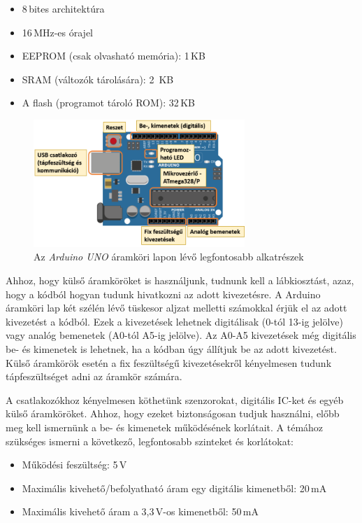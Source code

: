 \documentclass{thesis-ekf}
\theoremstyle{definition}
\begin{document}
\begin{itemize}
	\item 8\,bites architektúra
	\item 16\,MHz-es órajel
	\item EEPROM (csak olvasható memória): 1\,KB
	\item SRAM (változók tárolására): 2~KB
	\item A flash (programot tároló ROM): 32\,KB
\end{itemize}

\begin{figure}[ht!]
	\centering
	\includegraphics[width=8cm]{arduinoUnoFelepites.png}
	\caption{Az \emph{Arduino UNO} áramköri lapon lévő legfontosabb alkatrészek}
	\label{fig-arduinoUnoFelepites}
\end{figure}

Ahhoz, hogy külső áramköröket is használjunk, tudnunk kell a lábkiosztást, azaz, hogy a kódból hogyan tudunk hivatkozni az adott kivezetésre. A Arduino áramköri lap két szélén lévő tüskesor aljzat melletti számokkal érjük el az adott kivezetést a kódból. Ezek a kivezetések lehetnek digitálisak (0-tól 13-ig jelölve) vagy analóg bemenetek (A0-tól A5-ig jelölve). Az A0-A5 kivezetések még digitális be- és kimenetek is lehetnek, ha a kódban úgy állítjuk be az adott kivezetést. Külső áramkörök esetén a fix feszültségű kivezetésekről kényelmesen tudunk tápfeszültséget adni az áramkör számára.

A csatlakozókhoz kényelmesen köthetünk szenzorokat, digitális IC-ket és egyéb külső áramköröket. Ahhoz, hogy ezeket biztonságosan tudjuk használni, előbb meg kell ismernünk a be- és kimenetek működésének korlátait. A témához szükséges ismerni a következő, legfontosabb szinteket és korlátokat:

\begin{itemize}
\item Működési feszültség: 5\,V
\item Maximális kivehető/befolyatható áram egy digitális kimenetből: 20\,mA
\item Maximális kivehető áram a 3,3\,V-os kimenetből: 50\,mA
\end{itemize}
\end{document}
